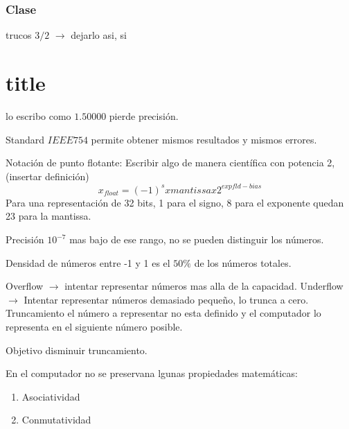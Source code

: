 \documentclass[]{article}
\title{}
\author{}
\begin{document}
\maketitle
\section{Clase}
trucos $3/2$ $\rightarrow$ dejarlo asi, si\part{title} lo escribo como $1.50000$ pierde precisión.


Standard $IEEE754$ permite obtener mismos resultados y mismos errores.


Notación de punto flotante:
Escribir algo de manera científica con potencia 2, (insertar definición)
\begin{equation}
x_{float}=(-1)^{s}xmantissax2^{expfld-bias}
\end{equation}
Para una representación de 32 bits, 1 para el signo, 8 para el exponente quedan 23 para la mantissa.


Precisión $10^{-7}$ mas bajo de ese rango, no se pueden distinguir los números.

Densidad de números entre -1 y 1 es el $50\%$ de los números totales.

Overflow $\rightarrow$ intentar representar números mas alla de la capacidad.
Underflow $\rightarrow$ Intentar representar números demasiado pequeño, lo trunca a cero.
Truncamiento el número a representar no esta definido y el computador lo representa en el siguiente número posible.

Objetivo disminuir truncamiento.

En el computador no se preservana lgunas propiedades matemáticas:
\begin{enumerate}
	\item Asociatividad
	\item Conmutatividad
\end{enumerate}
\end{document}
